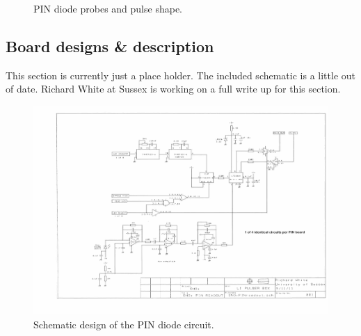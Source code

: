 \documentclass[12pt]{report}
\begin{document}
\begin{figure}
	\centering
	\caption{PIN diode probes and pulse shape.}
	\label{fig:PINDiodePots} 
\end{figure}


\subsection{Board designs \& description}
\label{subsec:PINDesigns}
This section is currently just a place holder. The included schematic is a little out of date. Richard White at Sussex is working on a full write up for this section. 

\begin{figure}[htbp]
	\begin{center}
		\includegraphics[width=1.0\textwidth]{PINSchematicDesign}
		\caption{Schematic design of the PIN diode circuit.}
		\label{fig:PINSchematicDesign}
	\end{center}
\end{figure}
\end{document}
